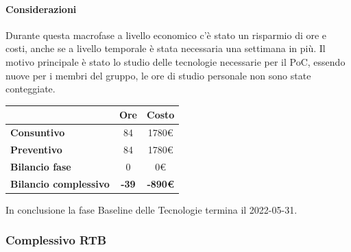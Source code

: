 \paragraph{Considerazioni} \hfill \break
Durante questa macrofase a livello economico c'è stato un risparmio di ore e costi, anche se a livello temporale è stata necessaria una settimana in più.
Il motivo principale è stato lo studio delle tecnologie necessarie per il PoC, essendo nuove per i membri del gruppo, le ore di studio personale non sono state conteggiate. \newline
\begin{center}
	\renewcommand{\arraystretch}{1.8}
	\begin{tabular}{ | l |c|c| }
    \hline
    & \textbf{Ore} & \textbf{Costo} \\
	\hline
    \textbf{Consuntivo} & 84 & 1780\euro \\
    \hline
    \textbf{Preventivo} & 84 & 1780\euro \\
    \hline
    \textbf{Bilancio fase} & 0 & 0\euro \\
    \hline
    \textbf{Bilancio complessivo} & \textbf{-39} & \textbf{-890\euro} \\
    \hline
    \end{tabular}
\end{center}
In conclusione la fase Baseline delle Tecnologie termina il 2022-05-31.


\subsubsection{Complessivo RTB}
